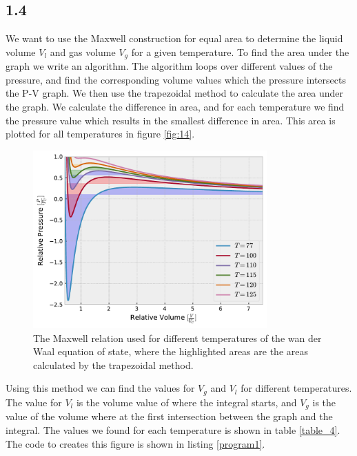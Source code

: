 \documentclass[a4paper,10pt, english]{article}
\begin{document}
\subsection*{1.4}
We want to use the Maxwell construction for equal area to determine the liquid volume $V_l$ and gas volume $V_g$ for a given temperature. To find the area under the graph we write an algorithm. The algorithm loops over different values of the pressure, and find the corresponding volume values which the pressure intersects the P-V graph. We then use the trapezoidal method to calculate the area under the graph. We calculate the difference in area, and for each temperature we find the pressure value which results in the smallest difference in area. This area is plotted for all temperatures in figure \vref{fig:14}.
\begin{figure}[h!]
  \centering
    \includegraphics[width=0.8\textwidth]{../figures/equation_of_state_area.pdf}
    \caption{The Maxwell relation used for different temperatures of the wan der Waal equation of state, where the highlighted areas are the areas calculated by the trapezoidal method.}
    \label{fig:14}
\end{figure}

Using this method we can find the values for $V_g$ and $V_l$ for different temperatures. The value for $V_l$ is the volume value of where the integral starts, and $V_g$ is the value of the volume where at the first intersection between the graph and the integral. The values we found for each temperature is shown in table \vref{table_4}.\\
The code to creates this figure is shown in listing \vref{program1}.
\end{document}
